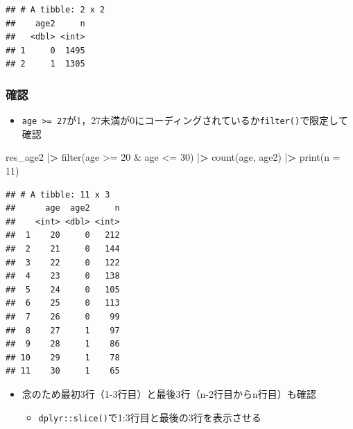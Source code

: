 \documentclass[
  xelatex,ja=standard, b5paper]{bxjsbook}
\newenvironment{Shaded}{\begin{snugshade}}{\end{snugshade}}
\newcommand{\AttributeTok}[1]{\textcolor[rgb]{0.77,0.63,0.00}{#1}}
\newcommand{\DecValTok}[1]{\textcolor[rgb]{0.00,0.00,0.81}{#1}}
\newcommand{\ErrorTok}[1]{\textcolor[rgb]{0.64,0.00,0.00}{\textbf{#1}}}
\newcommand{\FunctionTok}[1]{\textcolor[rgb]{0.00,0.00,0.00}{#1}}
\newcommand{\NormalTok}[1]{#1}
\newcommand{\SpecialCharTok}[1]{\textcolor[rgb]{0.00,0.00,0.00}{#1}}
\providecommand{\tightlist}{%
  \setlength{\itemsep}{0pt}\setlength{\parskip}{0pt}}
\begin{document}
\begin{verbatim}
## # A tibble: 2 x 2
##    age2     n
##   <dbl> <int>
## 1     0  1495
## 2     1  1305
\end{verbatim}

\hypertarget{ux78baux8a8d-1}{%
\subsubsection{確認}\label{ux78baux8a8d-1}}

\begin{itemize}
\tightlist
\item
  \texttt{age\ \textgreater{}=\ 27}が1，27未満が0にコーディングされているか\texttt{filter()}で限定して確認
\end{itemize}

\begin{Shaded}
\begin{Highlighting}[]
\NormalTok{res\_age2 }\SpecialCharTok{|}\ErrorTok{\textgreater{}} 
  \FunctionTok{filter}\NormalTok{(age }\SpecialCharTok{\textgreater{}=} \DecValTok{20} \SpecialCharTok{\&}\NormalTok{ age }\SpecialCharTok{\textless{}=} \DecValTok{30}\NormalTok{) }\SpecialCharTok{|}\ErrorTok{\textgreater{}} 
  \FunctionTok{count}\NormalTok{(age, age2) }\SpecialCharTok{|}\ErrorTok{\textgreater{}} 
  \FunctionTok{print}\NormalTok{(}\AttributeTok{n =} \DecValTok{11}\NormalTok{)}
\end{Highlighting}
\end{Shaded}

\begin{verbatim}
## # A tibble: 11 x 3
##      age  age2     n
##    <int> <dbl> <int>
##  1    20     0   212
##  2    21     0   144
##  3    22     0   122
##  4    23     0   138
##  5    24     0   105
##  6    25     0   113
##  7    26     0    99
##  8    27     1    97
##  9    28     1    86
## 10    29     1    78
## 11    30     1    65
\end{verbatim}

\begin{itemize}
\tightlist
\item
  念のため最初3行（1-3行目）と最後3行（n-2行目からn行目）も確認

  \begin{itemize}
  \tightlist
  \item
    \texttt{dplyr::slice()}で1:3行目と最後の3行を表示させる
  \end{itemize}
\end{itemize}
\end{document}
